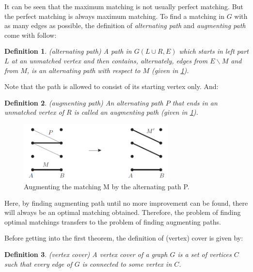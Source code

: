 \documentclass[14pt]{extarticle}
\newtheorem{definition}{Definition}
\begin{document}
It can be seen that the maximum matching is not usually perfect matching.
But the perfect matching is always maximum matching.
To find a matching in $G$ with as many edges as possible, the definition of {\it alternating path} and {\it augmenting path} come with follow:

\begin{definition}
  (alternating path)
  A path in $G(L\cup R,E)$ which starts in left part $L$ at an unmatched vertex and then contains, 
  alternately, edges from $E\backslash M$ and from $M$, is an alternating path with respect to $M$ (given in \ref{alternating_and_augmenting_path}).
\end{definition}

Note that the path is allowed to consist of its starting vertex only. And:

\begin{definition}
  (augmenting path)
  An alternating path $P$ that ends in an unmatched vertex of $R$ is called an augmenting path (given in \ref{alternating_and_augmenting_path}).
\end{definition}

\begin{figure}[H] \label{alternating_and_augmenting_path}
  \centering
  \includegraphics[width=0.7\textwidth]{alternating_and_augmenting_path.png}
  \caption{Augmenting the matching M by the alternating path P\cite{Diestel2017}.}
\end{figure} 

Here, by finding augmenting path until no more improvement can be found, there will always be an optimal matching obtained.
Therefore, the problem of finding optimal matchings transfers to the problem of finding augmenting paths.

Before getting into the first theorem, the definition of (vertex) cover is given by:

\begin{definition}
  (vertex cover)
  A vertex cover of a graph $G$ is a set of vertices $C$ such that every edge of $G$ is connected to some vertex in $C$.
\end{definition}
\end{document}
